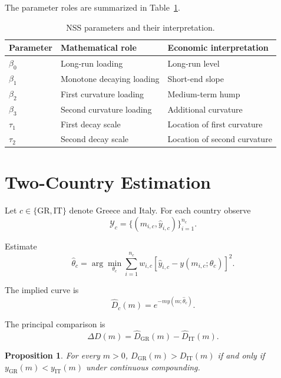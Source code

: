 \documentclass[a4paper,10pt]{article}
\newtheorem{proposition}{Proposition}[section]
\theoremstyle{remark}
\begin{document}
The parameter roles are summarized in Table~\ref{tab:parameters}.

\begin{table}[H]
\centering
\caption{NSS parameters and their interpretation.}
\label{tab:parameters}
\begin{tabular}{lll}
\toprule
Parameter & Mathematical role & Economic interpretation\\
\midrule
$\beta_0$ & Long-run loading & Long-run level\\
$\beta_1$ & Monotone decaying loading & Short-end slope\\
$\beta_2$ & First curvature loading & Medium-term hump\\
$\beta_3$ & Second curvature loading & Additional curvature\\
$\tau_1$ & First decay scale & Location of first curvature\\
$\tau_2$ & Second decay scale & Location of second curvature\\
\bottomrule
\end{tabular}
\end{table}

\section{Two-Country Estimation}

Let $c\in\{\mathrm{GR},\mathrm{IT}\}$ denote Greece and Italy. For each country observe
\begin{equation}
\mathcal{Y}_c=\{(m_{i,c},\hat y_{i,c})\}_{i=1}^{n_c}.
\end{equation}

Estimate
\begin{equation}
\hat\theta_c
=\arg\min_{\theta_c}
\sum_{i=1}^{n_c}w_{i,c}
\left[\hat y_{i,c}-y(m_{i,c};\theta_c)\right]^2.
\end{equation}

The implied curve is
\begin{equation}
\hat D_c(m)=e^{-m y(m;\hat\theta_c)}.
\end{equation}

The principal comparison is
\begin{equation}
\Delta D(m)=\hat D_{\mathrm{GR}}(m)-\hat D_{\mathrm{IT}}(m).
\end{equation}

\begin{proposition}
For every $m>0$, $D_{\mathrm{GR}}(m)>D_{\mathrm{IT}}(m)$ if and only if $y_{\mathrm{GR}}(m)<y_{\mathrm{IT}}(m)$ under continuous compounding.
\end{proposition}
\end{document}
